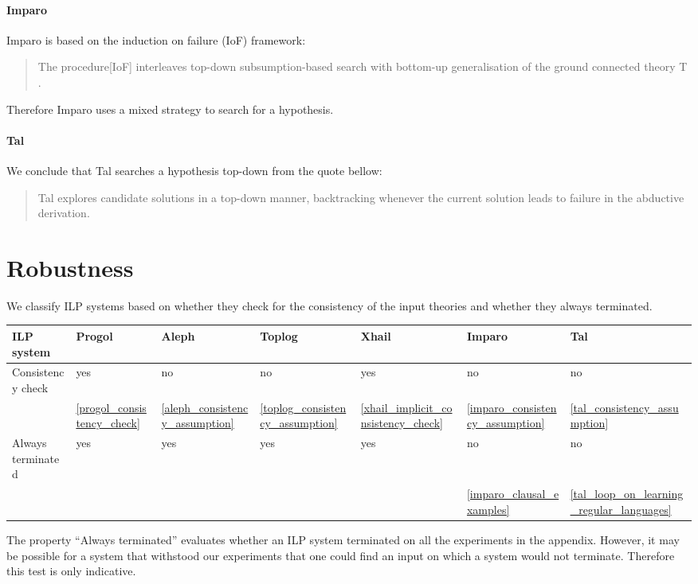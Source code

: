 \paragraph{Imparo}
Imparo is based on the induction on failure (IoF) framework:
\begin{quote}\cite{kimber2012learning}
The procedure[IoF] interleaves top-down subsumption-based search with bottom-up generalisation of the ground connected theory T .
\end{quote}
Therefore Imparo uses a mixed strategy to search for a hypothesis.
\paragraph{Tal}
We conclude that Tal searches a hypothesis top-down from the quote bellow:
\begin{quote}\cite{corapi2010inductive}
Tal explores candidate solutions in a top-down manner,
backtracking whenever the current solution leads to failure in the abductive derivation.
\end{quote}

\section{Robustness}
We classify ILP systems based on whether they check for the consistency of the input theories and whether they always terminated.

\begin{center}
 \label{tab:title} 
\begin{tabular}{| l | l | l | l | l | l | l |}
    \hline
    ILP system & Progol & Aleph & Toplog & Xhail & Imparo & Tal \\ \hline
    Consistency check & yes & no & no & yes & no & no \\
	& \ref{progol_consistency_check}
	& \ref{aleph_consistency_assumption}
	& \ref{toplog_consistency_assumption}
	 & \ref{xhail_implicit_consistency_check}
	 & \ref{imparo_consistency_assumption}
	 & \ref{tal_consistency_assumption} \\ \hline
    Always terminated & yes & yes & yes & yes & no & no \\ 
	&  & & & & \ref{imparo_clausal_examples} & \ref{tal_loop_on_learning_regular_languages} \\ \hline
\end{tabular}
\end{center} 

The property ``Always terminated'' evaluates whether an ILP system terminated on all the experiments in the appendix. However, it may be possible for a system that withstood our experiments that one could find an input on which a system would not terminate. Therefore this test is only indicative.